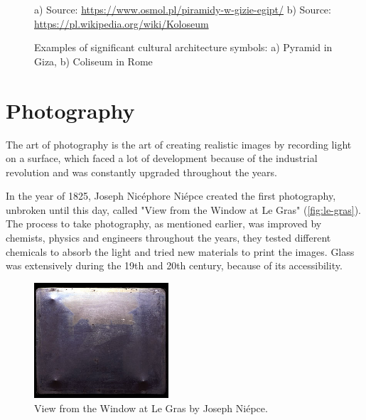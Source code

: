 \documentclass{report}
\begin{document}
\begin{figure}[h]
\center
a)  {Source: \url{https://www.osmol.pl/piramidy-w-gizie-egipt/}}
b)  {Source: \url{https://pl.wikipedia.org/wiki/Koloseum}}
\caption{Examples of significant cultural architecture symbols: a) Pyramid in Giza,
b) Coliseum in Rome}
\label{fig:archi-symb}
\end{figure}


\section{Photography}
The art of photography is the art of creating realistic images by recording light on a surface, which faced a lot of development because of the industrial revolution and was constantly upgraded throughout the years.

In the year of 1825, Joseph Nicéphore Niépce created the first photography, unbroken until this day, called "View from the Window at Le Gras" (\autoref{fig:le-gras}).
The process to take photography, as mentioned earlier, was improved by chemists, physics and engineers throughout the years, they tested different chemicals to absorb the light and tried new materials to print the images. Glass was extensively during the 19th and 20th century, because of its accessibility. 

\begin{figure}[h]
\center
\includegraphics[width=5cm]{img/legras}
\caption{View from the Window at Le Gras by Joseph Niépce.}
\label{fig:le-gras}
\end{figure}
\end{document}
